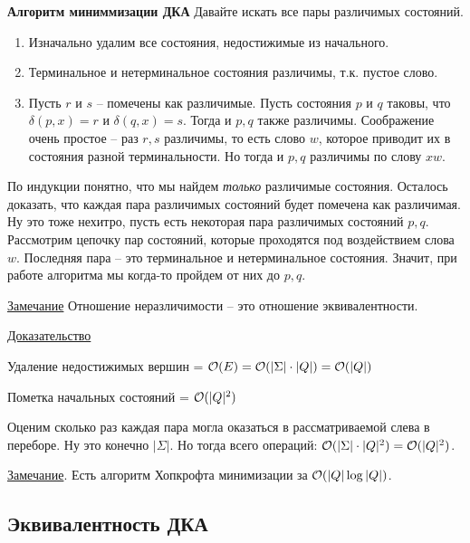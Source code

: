 \bigskip



\textbf{Алгоритм миниммизации ДКА}
Давайте искать все пары различимых состояний. 

\begin{enumerate}
	\item Изначально удалим все состояния, недостижимые из начального.
	
	\item Терминальное и нетерминальное состояния различимы, т.к. пустое слово.
	
	\item Пусть $ r $ и $ s $ -- помечены как различимые. Пусть состояния $ p $ и $ q $ таковы, что $ \delta(p, x) = r $ и $ \delta(q, x) = s $. Тогда и $ p, q $ также различимы. Соображение очень простое -- раз $ r,s $ различимы, то есть слово $ w $, которое приводит их в состояния разной терминальности. Но тогда и $ p, q $ различимы по слову $ xw $.
	
\end{enumerate}

По индукции понятно, что мы найдем \textit{только} различимые состояния. Осталось доказать, что каждая пара различимых состояний будет помечена как различимая. Ну это тоже нехитро, пусть есть некоторая пара различимых состояний $ p,q  $. Рассмотрим цепочку пар состояний, которые проходятся под воздействием слова $ w $. Последняя пара -- это терминальное и нетерминальное состояния. Значит, при работе алгоритма мы когда-то пройдем от них до $ p, q $. 

\underline{Замечание} Отношение неразличимости -- это отношение эквивалентности. 

\underline{Доказательство}

\begin{myindentpar}{0.5cm}
	Удаление недостижимых вершин = $ \mathcal{O}(E) = \mathcal{O}(|\Sigma| \cdot |Q|) = \mathcal{O}(|Q|) $
	
	Пометка начальных состояний = $ \mathcal{O}(|Q|^2) $
	
	Оценим сколько раз каждая пара могла оказаться в рассматриваемой слева в переборе. Ну это конечно $ |\Sigma| $. Но тогда всего операций: $ \mathcal{O} (|\Sigma| \cdot |Q|^2) = \mathcal{O}(|Q|^2) $.
	
\end{myindentpar}

\underline{Замечание}. Есть алгоритм Хопкрофта минимизации за $ \mathcal{O}(|Q| \log |Q|) $.


\bigskip


\subsection{Эквивалентность ДКА}

